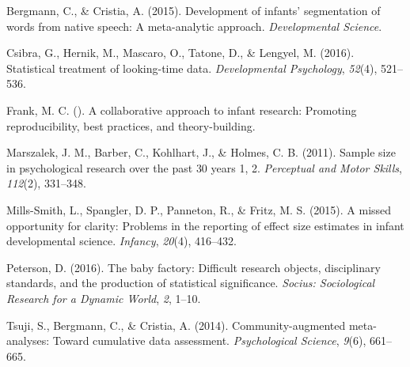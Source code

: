 \documentclass[english,floatsintext,man]{apa6}
\begin{document}
\hypertarget{ref-InWordDB}{}
Bergmann, C., \& Cristia, A. (2015). Development of infants'
segmentation of words from native speech: A meta-analytic approach.
\emph{Developmental Science}.

\hypertarget{ref-Csibra}{}
Csibra, G., Hernik, M., Mascaro, O., Tatone, D., \& Lengyel, M. (2016).
Statistical treatment of looking-time data. \emph{Developmental
Psychology}, \emph{52}(4), 521--536.

\hypertarget{ref-Manybabies}{}
Frank, M. C. (). A collaborative approach to infant research: Promoting
reproducibility, best practices, and theory-building.

\hypertarget{ref-Marszalek2011}{}
Marszalek, J. M., Barber, C., Kohlhart, J., \& Holmes, C. B. (2011).
Sample size in psychological research over the past 30 years 1, 2.
\emph{Perceptual and Motor Skills}, \emph{112}(2), 331--348.

\hypertarget{ref-Mills-Smith2015}{}
Mills-Smith, L., Spangler, D. P., Panneton, R., \& Fritz, M. S. (2015).
A missed opportunity for clarity: Problems in the reporting of effect
size estimates in infant developmental science. \emph{Infancy},
\emph{20}(4), 416--432.

\hypertarget{ref-Peterson2016}{}
Peterson, D. (2016). The baby factory: Difficult research objects,
disciplinary standards, and the production of statistical significance.
\emph{Socius: Sociological Research for a Dynamic World}, \emph{2},
1--10.

\hypertarget{ref-Tsuji2014}{}
Tsuji, S., Bergmann, C., \& Cristia, A. (2014). Community-augmented
meta-analyses: Toward cumulative data assessment. \emph{Psychological
Science}, \emph{9}(6), 661--665.
\end{document}
